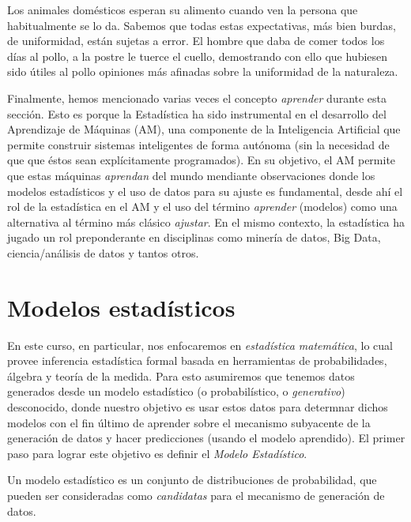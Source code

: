 \begin{displayquote}   
Los animales domésticos esperan su alimento
cuando ven la persona que habitualmente se lo da. Sabemos que todas estas
expectativas, más bien burdas, de uniformidad, están sujetas a error. El hombre que
daba de comer todos los días al pollo, a la postre le tuerce el cuello, demostrando con
ello que hubiesen sido útiles al pollo opiniones más afinadas sobre la uniformidad de la naturaleza.
\end{displayquote}

Finalmente, hemos mencionado varias veces el concepto \emph{aprender} durante esta sección. Esto es porque la Estadística ha sido instrumental en el desarrollo del Aprendizaje de Máquinas (AM),  una componente de la Inteligencia Artificial que permite construir sistemas inteligentes de forma autónoma (sin la necesidad de que que éstos sean explícitamente programados). En su objetivo, el AM permite que estas máquinas \emph{aprendan} del mundo mendiante observaciones donde los modelos estadísticos y el uso de datos para su ajuste es fundamental, desde ahí el rol de la estadística en el AM y el uso del término \emph{aprender} (modelos) como una alternativa al término más clásico \emph{ajustar}. En el mismo contexto, la estadística ha jugado un rol preponderante en disciplinas como minería de datos, Big Data, ciencia/análisis de datos y tantos otros. 


\section{Modelos estadísticos}


En este curso, en particular, nos enfocaremos en  \emph{estadística matemática}, lo cual provee inferencia estadística formal basada en herramientas de probabilidades, álgebra y teoría de la medida. Para esto asumiremos que tenemos datos generados desde un modelo estadístico (o probabilístico, o \emph{generativo}) desconocido, donde nuestro objetivo es usar estos datos para determnar dichos modelos con el fin 
último de aprender sobre el mecanismo subyacente de la generación de datos y hacer predicciones (usando el modelo aprendido). El primer paso para lograr este objetivo es definir el \emph{Modelo Estadístico}.

\begin{definition} 
Un modelo estadístico es un conjunto de distribuciones de probabilidad, que pueden ser consideradas como \emph{candidatas} para el mecanismo de generación de datos. 
\end{definition}

